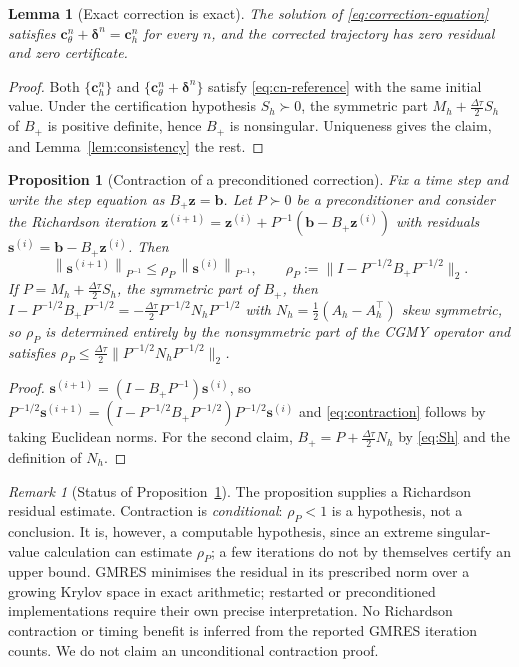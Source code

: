 \documentclass[11pt]{amsart}
\newtheorem{proposition}[theorem]{Proposition}
\newtheorem{lemma}[theorem]{Lemma}
\theoremstyle{remark}
\newtheorem{remark}[theorem]{Remark}
\newcommand{\Mh}{M_h}
\newcommand{\Ah}{A_h}
\newcommand{\Sh}{S_h}
\newcommand{\norm}[1]{\left\lVert #1\right\rVert}
\newcommand{\dt}{\Delta\tau}
\newcommand{\cc}{\mathbf c}
\newcommand{\bb}{\mathbf b}
\newcommand{\zz}{\mathbf z}
\newcommand{\sres}{\mathbf s}
\newcommand{\dd}{\bm\delta}
\begin{document}
\begin{lemma}[Exact correction is exact]
\label{lem:exact-correction}
The solution of \eqref{eq:correction-equation} satisfies
$\cc_\theta^n+\dd^n=\cc_h^n$ for every $n$, and the corrected trajectory has
zero residual and zero certificate.
\end{lemma}

\begin{proof}
Both $\{\cc_h^n\}$ and $\{\cc_\theta^n+\dd^n\}$ satisfy
\eqref{eq:cn-reference} with the same initial value.  Under the certification
hypothesis $\Sh\succ0$, the symmetric part
$\Mh+\tfrac{\dt}{2}\Sh$ of $B_+$ is positive definite, hence $B_+$ is
nonsingular.  Uniqueness gives the claim, and Lemma~\ref{lem:consistency} the
rest.
\end{proof}

\begin{proposition}[Contraction of a preconditioned correction]
\label{prop:correction-contraction}
Fix a time step and write the step equation as $B_+\zz=\bb$.  Let $P\succ0$ be
a preconditioner and consider the Richardson iteration
$\zz^{(i+1)}=\zz^{(i)}+P^{-1}(\bb-B_+\zz^{(i)})$ with residuals
$\sres^{(i)}=\bb-B_+\zz^{(i)}$.  Then
\begin{equation}
  \norm{\sres^{(i+1)}}_{P^{-1}}\le\rho_P\,\norm{\sres^{(i)}}_{P^{-1}},
  \qquad
  \rho_P:=\bigl\lVert I-P^{-1/2}B_+P^{-1/2}\bigr\rVert_2 .
  \label{eq:contraction}
\end{equation}
If $P=\Mh+\tfrac{\dt}{2}\Sh$, the symmetric part of $B_+$, then
$I-P^{-1/2}B_+P^{-1/2}=-\tfrac{\dt}{2}P^{-1/2}N_hP^{-1/2}$ with
$N_h=\tfrac12(\Ah-\Ah^\top)$ skew symmetric, so $\rho_P$ is determined
entirely by the nonsymmetric part of the CGMY operator and satisfies
$\rho_P\le\tfrac{\dt}{2}\lVert P^{-1/2}N_hP^{-1/2}\rVert_2$.
\end{proposition}

\begin{proof}
$\sres^{(i+1)}=(I-B_+P^{-1})\sres^{(i)}$, so
$P^{-1/2}\sres^{(i+1)}=(I-P^{-1/2}B_+P^{-1/2})P^{-1/2}\sres^{(i)}$ and
\eqref{eq:contraction} follows by taking Euclidean norms.  For the second
claim, $B_+=P+\tfrac{\dt}{2}N_h$ by \eqref{eq:Sh} and the definition of $N_h$.
\end{proof}

\begin{remark}[Status of Proposition~\ref{prop:correction-contraction}]
\label{rem:contraction-status}
The proposition supplies a Richardson residual estimate. Contraction is
\emph{conditional}: $\rho_P<1$ is a
hypothesis, not a conclusion.  It is, however, a computable hypothesis, since an extreme singular-value calculation can estimate $\rho_P$;
a few iterations do not by themselves certify an upper bound. GMRES minimises
the residual in its prescribed norm over a growing Krylov space in exact
arithmetic; restarted or preconditioned implementations require their own
precise interpretation. No Richardson contraction or timing benefit is
inferred from the reported GMRES iteration counts.  We do not claim an unconditional contraction
proof.
\end{remark}
\end{document}
